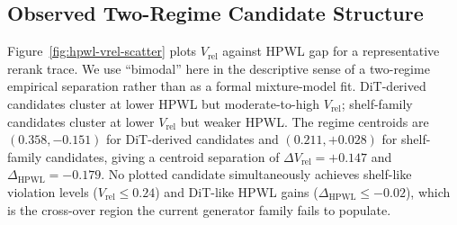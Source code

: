 \documentclass[nolineno]{ieeeaccess}
\begin{document}
\subsection{Observed Two-Regime Candidate Structure}
Figure~\ref{fig:hpwl-vrel-scatter} plots $V_{\text{rel}}$ against HPWL
gap for a representative rerank trace. We use ``bimodal'' here in the
descriptive sense of a two-regime empirical separation rather than as a
formal mixture-model fit. DiT-derived candidates cluster at lower HPWL
but moderate-to-high $V_{\text{rel}}$; shelf-family candidates cluster
at lower $V_{\text{rel}}$ but weaker HPWL. The regime centroids are
$(0.358,-0.151)$ for DiT-derived candidates and $(0.211,+0.028)$ for
shelf-family candidates, giving a centroid separation of
$\Delta V_{\text{rel}}=+0.147$ and
$\Delta_{\text{HPWL}}=-0.179$. No plotted candidate simultaneously
achieves shelf-like violation levels ($V_{\text{rel}}\le 0.24$) and
DiT-like HPWL gains ($\Delta_{\text{HPWL}}\le -0.02$), which is the
cross-over region the current generator family fails to populate.
\end{document}
